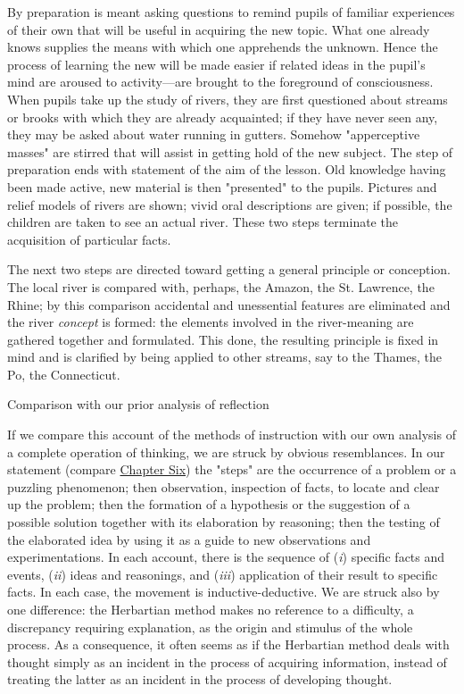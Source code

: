 \documentclass[letterpaper]{book}
\begin{document}
By preparation is meant asking questions to remind pupils of familiar
experiences of their own that will be useful in acquiring the new topic.
What one already knows supplies the means with which one apprehends the
unknown. Hence the process of learning the new will be made easier if
related ideas in the pupil's mind are aroused to activity---are brought
to the foreground of consciousness. When pupils take up the study of
rivers, they are first questioned about streams or
brooks
with which they are already acquainted; if they have never seen any,
they may be asked about water running in gutters. Somehow "apperceptive
masses" are stirred that will assist in getting hold of the new subject.
The step of preparation ends with statement of the aim of the lesson.
Old knowledge having been made active, new material is then "presented"
to the pupils. Pictures and relief models of rivers are shown; vivid
oral descriptions are given; if possible, the children are taken to see
an actual river. These two steps terminate the acquisition of particular
facts.

The next two steps are directed toward getting a general principle or
conception. The local river is compared with, perhaps, the Amazon, the
St. Lawrence, the Rhine; by this comparison accidental and unessential
features are eliminated and the river \emph{concept} is formed: the
elements involved in the river-meaning are gathered together and
formulated. This done, the resulting principle is fixed in mind and is
clarified by being applied to other streams, say to the Thames, the Po,
the Connecticut.

Comparison with our prior analysis of reflection

If we compare this account of the methods of instruction with our own
analysis of a complete operation of thinking, we are struck by obvious
resemblances. In our statement (compare
\protect\hyperlink{ux40publicux40vhostux40gux40gutenbergux40htmlux40filesux4037423ux4037423-hux4037423-h-2.htm.htmlux5cux23CHAPTER_SIX}{Chapter
Six}) the "steps" are the occurrence of a problem or a puzzling
phenomenon; then observation, inspection of facts, to locate and clear
up the problem; then the formation of a hypothesis or the suggestion of
a possible solution together with its elaboration by reasoning; then the
testing of the elaborated idea by using it as a guide to new
observations and experimentations. In each account, there is the
sequence of (\emph{i}) specific facts
and
events, (\emph{ii}) ideas and reasonings, and (\emph{iii}) application
of their result to specific facts. In each case, the movement is
inductive-deductive. We are struck also by one difference: the
Herbartian method makes no reference to a difficulty, a discrepancy
requiring explanation, as the origin and stimulus of the whole process.
As a consequence, it often seems as if the Herbartian method deals with
thought simply as an incident in the process of acquiring information,
instead of treating the latter as an incident in the process of
developing thought.
\end{document}
